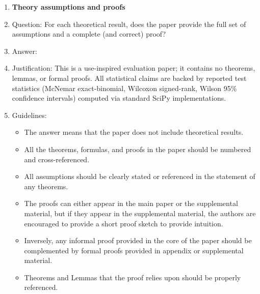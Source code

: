 \begin{enumerate}
\begin{itemize}
        \item If applicable, the authors should discuss possible limitations of their approach to address problems of privacy and fairness.
        \item While the authors might fear that complete honesty about limitations might be used by reviewers as grounds for rejection, a worse outcome might be that reviewers discover limitations that aren't acknowledged in the paper. The authors should use their best judgment and recognize that individual actions in favor of transparency play an important role in developing norms that preserve the integrity of the community. Reviewers will be specifically instructed to not penalize honesty concerning limitations.
    \end{itemize}

\item {\bf Theory assumptions and proofs}
    \item[] Question: For each theoretical result, does the paper provide the full set of assumptions and a complete (and correct) proof?
    \item[] Answer: \answerNA{}
    \item[] Justification: This is a use-inspired evaluation paper; it contains no theorems, lemmas, or formal proofs. All statistical claims are backed by reported test statistics (McNemar exact-binomial, Wilcoxon signed-rank, Wilson 95\% confidence intervals) computed via standard SciPy implementations.
    \item[] Guidelines:
    \begin{itemize}
        \item The answer \answerNA{} means that the paper does not include theoretical results.
        \item All the theorems, formulas, and proofs in the paper should be numbered and cross-referenced.
        \item All assumptions should be clearly stated or referenced in the statement of any theorems.
        \item The proofs can either appear in the main paper or the supplemental material, but if they appear in the supplemental material, the authors are encouraged to provide a short proof sketch to provide intuition.
        \item Inversely, any informal proof provided in the core of the paper should be complemented by formal proofs provided in appendix or supplemental material.
        \item Theorems and Lemmas that the proof relies upon should be properly referenced.
    \end{itemize}


\end{enumerate}

